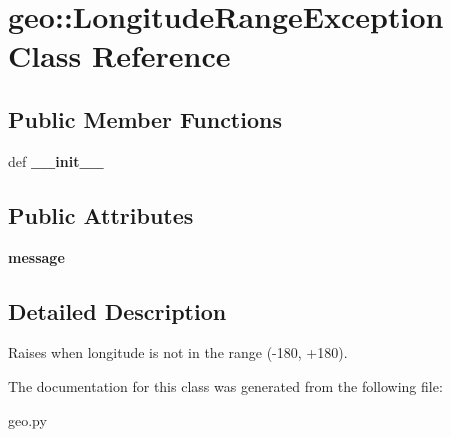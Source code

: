 \hypertarget{classgeo_1_1LongitudeRangeException}{
\section{geo::LongitudeRangeException Class Reference}
\label{classgeo_1_1LongitudeRangeException}
}
\subsection*{Public Member Functions}
\begin{DoxyCompactItemize}
\item 
\hypertarget{classgeo_1_1LongitudeRangeException_aeb4d34c53af6358b284126147f1b4b74}{
def {\bfseries \_\-\_\-init\_\-\_\-}}
\label{classgeo_1_1LongitudeRangeException_aeb4d34c53af6358b284126147f1b4b74}

\end{DoxyCompactItemize}
\subsection*{Public Attributes}
\begin{DoxyCompactItemize}
\item 
\hypertarget{classgeo_1_1LongitudeRangeException_abe8008437fc96ab09a3e7da9cc2b7db1}{
{\bfseries message}}
\label{classgeo_1_1LongitudeRangeException_abe8008437fc96ab09a3e7da9cc2b7db1}

\end{DoxyCompactItemize}


\subsection{Detailed Description}
\begin{DoxyVerb}Raises when longitude is not in the range (-180, +180).\end{DoxyVerb}
 

The documentation for this class was generated from the following file:\begin{DoxyCompactItemize}
\item 
geo.py\end{DoxyCompactItemize}
